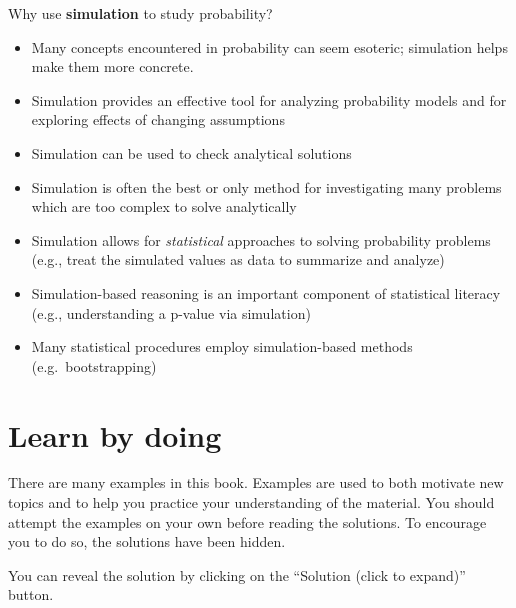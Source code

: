 \documentclass[
  letterpaper,
  DIV=11,
  numbers=noendperiod]{scrreprt}
\providecommand{\tightlist}{%
  \setlength{\itemsep}{0pt}\setlength{\parskip}{0pt}}
\theoremstyle{plain}
\theoremstyle{definition}
\theoremstyle{definition}
\theoremstyle{definition}
\theoremstyle{remark}
\begin{document}
Why use \textbf{simulation} to study probability?

\begin{itemize}
\tightlist
\item
  Many concepts encountered in probability can seem esoteric; simulation
  helps make them more concrete.
\item
  Simulation provides an effective tool for analyzing probability models
  and for exploring effects of changing assumptions
\item
  Simulation can be used to check analytical solutions
\item
  Simulation is often the best or only method for investigating many
  problems which are too complex to solve analytically
\item
  Simulation allows for \emph{statistical} approaches to solving
  probability problems (e.g., treat the simulated values as data to
  summarize and analyze)
\item
  Simulation-based reasoning is an important component of statistical
  literacy (e.g., understanding a p-value via simulation)
\item
  Many statistical procedures employ simulation-based methods
  (e.g.~bootstrapping)
\end{itemize}

\section*{Learn by doing}\label{learn-by-doing}


\begin{tcolorbox}[enhanced jigsaw, opacityback=0, left=2mm, colframe=quarto-callout-note-color-frame, toprule=.15mm, breakable, colback=white, leftrule=.75mm, arc=.35mm, rightrule=.15mm, bottomrule=.15mm]

There are many examples in this book. Examples are used to both motivate
new topics and to help you practice your understanding of the material.
You should attempt the examples on your own before reading the
solutions. To encourage you to do so, the solutions have been hidden.

\end{tcolorbox}

\begin{tcolorbox}[enhanced jigsaw, opacityback=0, rightrule=.15mm, coltitle=black, colframe=quarto-callout-tip-color-frame, toprule=.15mm, colbacktitle=quarto-callout-tip-color!10!white, opacitybacktitle=0.6, left=2mm, toptitle=1mm, breakable, title={Solution (click to expand)}, bottomtitle=1mm, colback=white, leftrule=.75mm, titlerule=0mm, arc=.35mm, bottomrule=.15mm]

You can reveal the solution by clicking on the ``Solution (click to
expand)'' button.

\end{tcolorbox}
\end{document}
